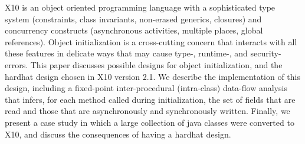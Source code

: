 X10 is an object oriented programming language with a sophisticated
    type system (constraints, class invariants, non-erased generics, closures)
    and concurrency constructs (asynchronous activities, multiple places, global references).
Object initialization is a cross-cutting concern that interacts with all these features
    in delicate ways that may cause type-, runtime-, and security- errors.
This paper discusses possible designs for object initialization,
    and the hardhat design chosen in X10 version 2.1.
We describe the implementation of this design, including a
    fixed-point inter-procedural (intra-class)
    data-flow analysis
    that infers, for each method called during initialization,
    the set of fields that are read and
    those that are asynchronously and synchronously written.
Finally, we present a case study in which a large collection of java classes
    were converted to X10,
    and discuss the consequences of having a hardhat design.
